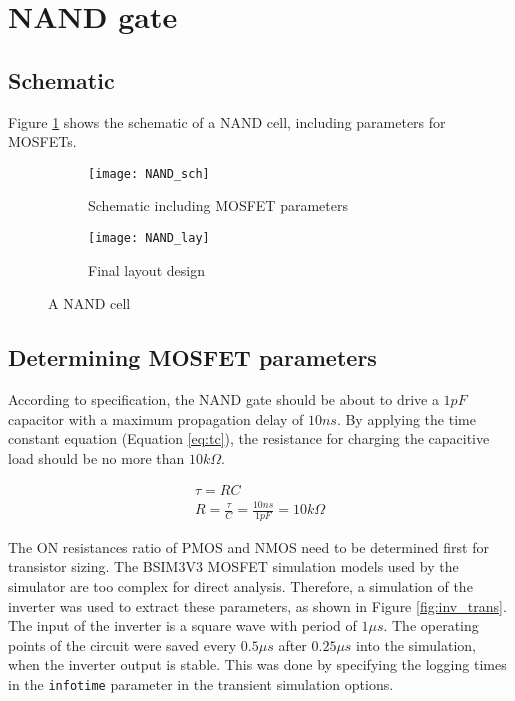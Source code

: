 \section{NAND gate}

\subsection{Schematic}

Figure \ref{fig:nand_sch} shows the schematic of a NAND cell, including parameters for MOSFETs.

\begin{figure}[!htb]
	\centering
	\begin{subfigure}[b]{0.55\textwidth}
		\texttt{[image: NAND\_sch]}
		\caption{Schematic including MOSFET parameters}
		\label{fig:nand_sch}
	\end{subfigure}
	\begin{subfigure}[b]{0.3\textwidth}
		\texttt{[image: NAND\_lay]}
		\caption{Final layout design}
		\label{fig:nand_lay}
	\end{subfigure}
	\caption{A NAND cell}
\end{figure}

\subsection{Determining MOSFET parameters}

According to specification, the NAND gate should be about to drive a $1 pF$ capacitor with a maximum propagation delay of $10 ns$. By applying the time constant equation (Equation \ref{eq:tc}), the resistance for charging the capacitive load should be no more than $10 k \Omega$.

\begin{gather}
	\tau = R C \label{eq:tc} \\
	R = \frac{\tau}{C} = \frac{10 ns}{1 pF} = 10k \Omega \nonumber
\end{gather}

The ON resistances ratio of PMOS and NMOS need to be determined first for transistor sizing. The BSIM3V3 MOSFET simulation models used by the simulator are too complex for direct analysis. Therefore, a simulation of the inverter was used to extract these parameters, as shown in Figure \ref{fig:inv_trans}. The input of the inverter is a square wave with period of $1 \mu s$. The operating points of the circuit were saved every $0.5 \mu s$ after $0.25 \mu s$ into the simulation, when the inverter output is stable. This was done by specifying the logging times in the \texttt{infotime} parameter in the transient simulation options.

